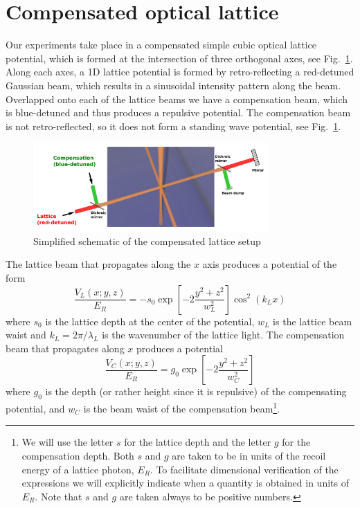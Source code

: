 \documentclass[11pt,letter]{article}
\begin{document}
\section{ Compensated optical lattice} 

Our experiments take place in a compensated simple cubic optical lattice
potential, which is formed at the intersection of three orthogonal axes, see
Fig.~\ref{fig:compensated_lattice_simple_schematic}.  Along each axes, a 1D
lattice potential is formed by retro-reflecting a red-detuned Gaussian beam,
which results in a sinusoidal intensity pattern along the beam.  Overlapped onto
each of the lattice beams we have a compensation beam, which is blue-detuned
and thus produces a repulsive potential.   The compensation beam is not
retro-reflected, so it does not form a standing wave potential, see
Fig.~\ref{fig:compensated_lattice_simple_schematic}.  
\begin{figure}
    \centering
\includegraphics[width=0.8\textwidth]{figures/compensated_lattice_simple_schematic.png}
\caption{Simplified schematic of the compensated lattice
setup}\label{fig:compensated_lattice_simple_schematic}
\end{figure}

The lattice beam that propagates along the $x$ axis produces a potential of the
form 
\begin{equation}
 \frac{ V_{L}( x; y,z) }{E_{R}} = 
  - s_{0} \exp\left[- 2 \frac{ y^{2} + z^{2} }{w_{L}^{2}} \right]
  \cos^{2}( k_{L} x ) 
\end{equation}
where $s_{0}$ is the lattice depth at the center of the potential,  $w_{L}$ is
the lattice beam waist and $k_{L} = 2\pi/\lambda_{L}$ is the wavenumber of the
lattice light.
The compensation beam that propagates along $x$ produces a potential  
\begin{equation}
 \frac{ V_{C}( x; y, z) }{E_{R}} = 
   g_{0}  \exp\left[ -2 \frac{ y^{2} + z^{2} }{w_{C}^{2}} \right] 
\label{eq:Vcomp}
\end{equation}
where  $g_{0}$ is the depth (or rather height since it is repulsive) of the
compensating potential, and $w_{C}$ is the beam waist of the compensation
beam\footnote{We will use the letter $s$ for the lattice depth and the letter
$g$ for the compensation depth.  Both $s$ and $g$ are taken to be in units of
the recoil energy of a lattice photon, $E_{R}$.  To facilitate dimensional
verification of the expressions we will explicitly indicate when a quantity is
obtained in units of $E_{R}$.  Note that $s$ and $g$ are taken always to be
positive numbers.  }.
\end{document}
